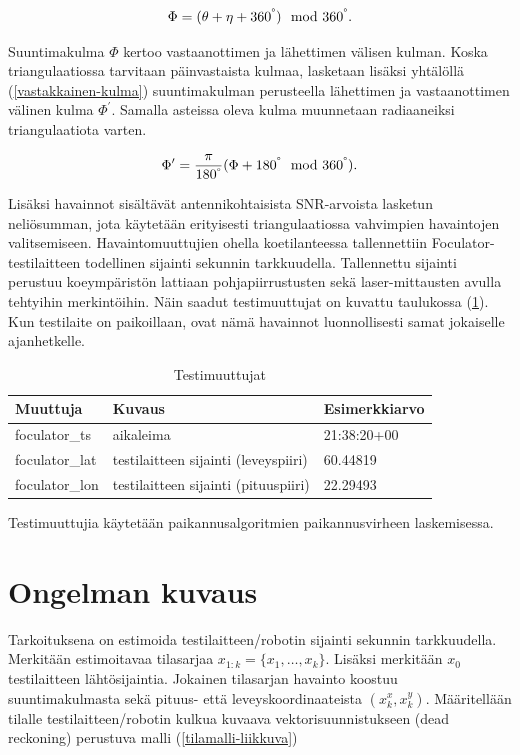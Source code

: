 \documentclass[
  12pt,
  a4paper, twoside]{book}
\begin{document}
\begin{align}
\Phi=(\theta + \eta+360^\degree) \mod360^\degree.
\end{align}

Suuntimakulma \(\Phi\) kertoo vastaanottimen ja lähettimen välisen kulman. Koska triangulaatiossa tarvitaan päinvastaista kulmaa, lasketaan lisäksi yhtälöllä (\ref{vastakkainen-kulma}) suuntimakulman perusteella lähettimen ja vastaanottimen välinen kulma \(\Phi^\prime\). Samalla asteissa oleva kulma muunnetaan radiaaneiksi triangulaatiota varten.

\begin{align}\label{vastakkainen-kulma}
\Phi^\prime=\frac{\pi}{180^\degree}(\Phi+180^\degree \mod360^\degree).
\end{align}

Lisäksi havainnot sisältävät antennikohtaisista SNR-arvoista lasketun neliösumman, jota käytetään erityisesti triangulaatiossa vahvimpien havaintojen valitsemiseen. Havaintomuuttujien ohella koetilanteessa tallennettiin Foculator-testilaitteen todellinen sijainti sekunnin tarkkuudella. Tallennettu sijainti perustuu koeympäristön lattiaan pohjapiirrustusten sekä laser-mittausten avulla tehtyihin merkintöihin. Näin saadut testimuuttujat on kuvattu taulukossa (\ref{tab:testimuuttujat}). Kun testilaite on paikoillaan, ovat nämä havainnot luonnollisesti samat jokaiselle ajanhetkelle.

\def\arraystretch{1.25} 
\begin{table}[H]
\centering
\begin{tabular}{|l|l|l|}
\hline
Muuttuja & Kuvaus & Esimerkkiarvo\\
\hline
foculator\_ts & aikaleima & 21:38:20+00\\
foculator\_lat & testilaitteen sijainti (leveyspiiri) & 60.44819 \\
foculator\_lon & testilaitteen sijainti (pituuspiiri) & 22.29493 \\
\hline
\end{tabular}
\caption{Testimuuttujat}
\label{tab:testimuuttujat}
\end{table}

\noindent Testimuuttujia käytetään paikannusalgoritmien paikannusvirheen laskemisessa.

\section{Ongelman kuvaus}

Tarkoituksena on estimoida testilaitteen/robotin sijainti sekunnin tarkkuudella. Merkitään estimoitavaa tilasarjaa \(x_{1:k}=\{x_1,\ldots,x_k\}\). Lisäksi merkitään \(x_0\) testilaitteen lähtösijaintia. Jokainen tilasarjan havainto koostuu suuntimakulmasta sekä pituus- että leveyskoordinaateista \((x_k^x, x_k^y)\). Määritellään tilalle testilaitteen/robotin kulkua kuvaava vektorisuunnistukseen (dead reckoning) perustuva malli (\ref{tilamalli-liikkuva})
\end{document}
